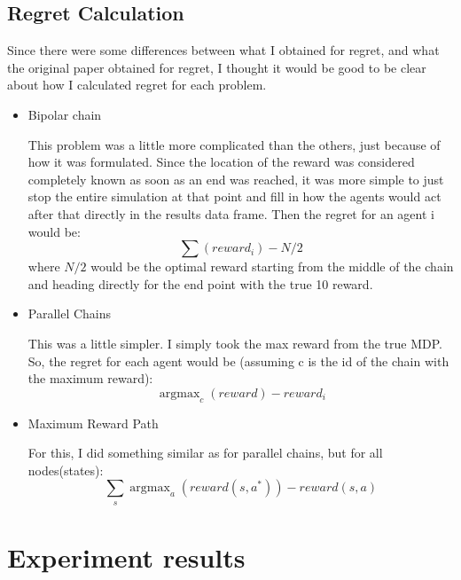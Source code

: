 \documentclass{article}
\DeclareMathOperator*{\argmax}{argmax}
\begin{document}
\subsection{Regret Calculation}
Since there were some differences between what I obtained for regret, and what the original paper obtained for regret, I thought it would be good to be clear about how I calculated regret for each problem.
\begin{itemize}
\item Bipolar chain

This problem was a little more complicated than the others, just because of how it was formulated. Since the location of the reward was considered completely known as soon as an end was reached, it was more simple to just stop the entire simulation at that point and fill in how the agents would act after that directly in the results data frame. Then the regret for an agent i would be:
$$\sum(reward_i) - N/2 $$
where $N/2$ would be the optimal reward starting from the middle of the chain and heading directly for the end point with the true 10 reward.

\item Parallel Chains

This was a little simpler. I simply took the max reward from the true MDP.
So, the regret for each agent would be (assuming c is the id of the chain with the maximum reward):
$$\argmax_c(reward) - reward_{i}$$

\item Maximum Reward Path

For this, I did something similar as for parallel chains, but for all nodes(states):
$$\sum_s \argmax_a(reward(s, a^*)) - reward(s, a) $$
\end{itemize}
\section{Experiment results}
\end{document}
